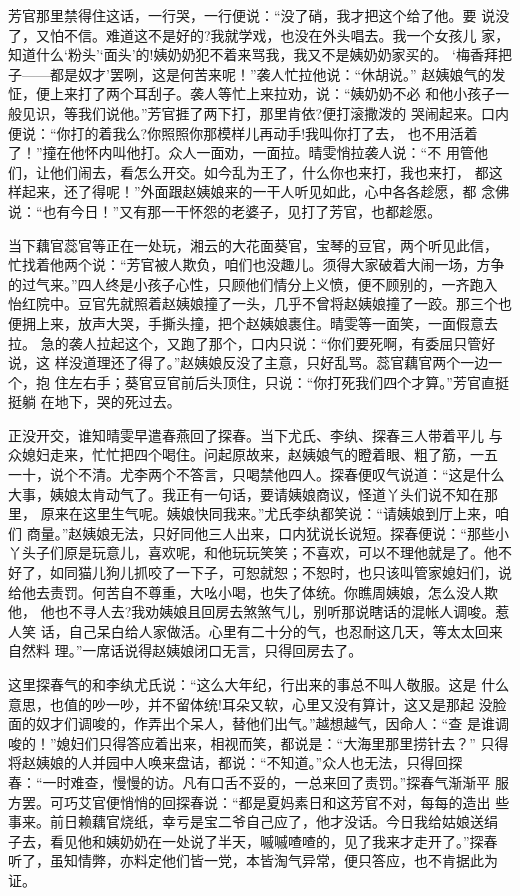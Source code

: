 芳官那里禁得住这话，一行哭，一行便说：“没了硝，我才把这个给了他。要
说没了，又怕不信。难道这不是好的?我就学戏，也没在外头唱去。我一个女孩儿
家，知道什么‘粉头’‘面头’的!姨奶奶犯不着来骂我，我又不是姨奶奶家买的。
‘梅香拜把子——都是奴才’罢咧，这是何苦来呢！”袭人忙拉他说：“休胡说。”
赵姨娘气的发怔，便上来打了两个耳刮子。袭人等忙上来拉劝，说：“姨奶奶不必
和他小孩子一般见识，等我们说他。”芳官捱了两下打，那里肯依?便打滚撒泼的
哭闹起来。口内便说：“你打的着我么?你照照你那模样儿再动手!我叫你打了去，
也不用活着了！”撞在他怀内叫他打。众人一面劝，一面拉。晴雯悄拉袭人说：“不
用管他们，让他们闹去，看怎么开交。如今乱为王了，什么你也来打，我也来打，
都这样起来，还了得呢！”外面跟赵姨娘来的一干人听见如此，心中各各趁愿，都
念佛说：“也有今日！”又有那一干怀怨的老婆子，见打了芳官，也都趁愿。

当下藕官蕊官等正在一处玩，湘云的大花面葵官，宝琴的豆官，两个听见此信，
忙找着他两个说：“芳官被人欺负，咱们也没趣儿。须得大家破着大闹一场，方争
的过气来。”四人终是小孩子心性，只顾他们情分上义愤，便不顾别的，一齐跑入
怡红院中。豆官先就照着赵姨娘撞了一头，几乎不曾将赵姨娘撞了一跤。那三个也
便拥上来，放声大哭，手撕头撞，把个赵姨娘裹住。晴雯等一面笑，一面假意去拉。
急的袭人拉起这个，又跑了那个，口内只说：“你们要死啊，有委屈只管好说，这
样没道理还了得了。”赵姨娘反没了主意，只好乱骂。蕊官藕官两个一边一个，抱
住左右手；葵官豆官前后头顶住，只说：“你打死我们四个才算。”芳官直挺挺躺
在地下，哭的死过去。

正没开交，谁知晴雯早遣春燕回了探春。当下尤氏、李纨、探春三人带着平儿
与众媳妇走来，忙忙把四个喝住。问起原故来，赵姨娘气的瞪着眼、粗了筋，一五
一十，说个不清。尤李两个不答言，只喝禁他四人。探春便叹气说道：“这是什么
大事，姨娘太肯动气了。我正有一句话，要请姨娘商议，怪道丫头们说不知在那里，
原来在这里生气呢。姨娘快同我来。”尤氏李纨都笑说：“请姨娘到厅上来，咱们
商量。”赵姨娘无法，只好同他三人出来，口内犹说长说短。探春便说：“那些小
丫头子们原是玩意儿，喜欢呢，和他玩玩笑笑；不喜欢，可以不理他就是了。他不
好了，如同猫儿狗儿抓咬了一下子，可恕就恕；不恕时，也只该叫管家媳妇们，说
给他去责罚。何苦自不尊重，大吆小喝，也失了体统。你瞧周姨娘，怎么没人欺他，
他也不寻人去?我劝姨娘且回房去煞煞气儿，别听那说瞎话的混帐人调唆。惹人笑
话，自己呆白给人家做活。心里有二十分的气，也忍耐这几天，等太太回来自然料
理。”一席话说得赵姨娘闭口无言，只得回房去了。

这里探春气的和李纨尤氏说：“这么大年纪，行出来的事总不叫人敬服。这是
什么意思，也值的吵一吵，并不留体统!耳朵又软，心里又没有算计，这又是那起
没脸面的奴才们调唆的，作弄出个呆人，替他们出气。”越想越气，因命人：“查
是谁调唆的！”媳妇们只得答应着出来，相视而笑，都说是：“大海里那里捞针去？”
只得将赵姨娘的人并园中人唤来盘诘，都说：“不知道。”众人也无法，只得回探
春：“一时难查，慢慢的访。凡有口舌不妥的，一总来回了责罚。”探春气渐渐平
服方罢。可巧艾官便悄悄的回探春说：“都是夏妈素日和这芳官不对，每每的造出
些事来。前日赖藕官烧纸，幸亏是宝二爷自己应了，他才没话。今日我给姑娘送绢
子去，看见他和姨奶奶在一处说了半天，嘁嘁喳喳的，见了我来才走开了。”探春
听了，虽知情弊，亦料定他们皆一党，本皆淘气异常，便只答应，也不肯据此为证。

